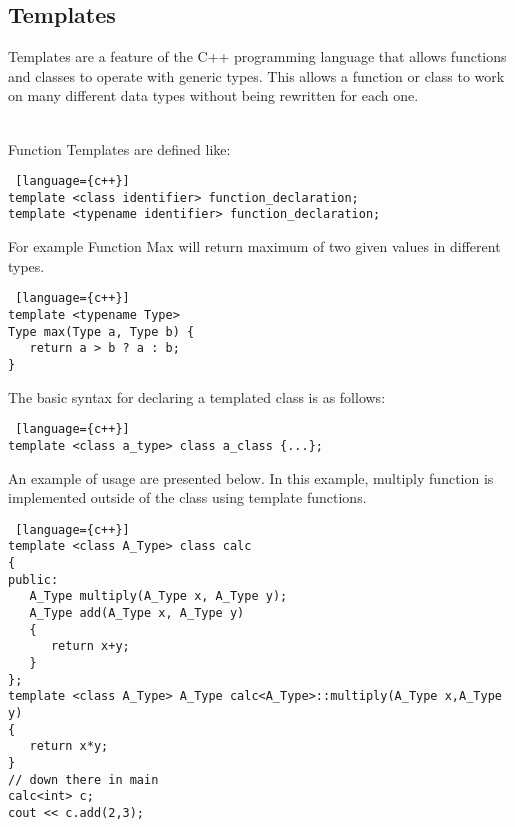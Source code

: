 \subsection{Templates}
Templates are a feature of the C++ programming language that allows functions and classes to operate with generic types. This allows a function or class to work on many different data types without being rewritten for each one.
\begin{note}\\
Function Templates are defined like:
\begin{lstlisting} [language={c++}]
template <class identifier> function_declaration;
template <typename identifier> function_declaration;
\end{lstlisting}
For example Function Max will return maximum of two given values in different types.
\begin{lstlisting} [language={c++}]
template <typename Type>
Type max(Type a, Type b) {
   return a > b ? a : b;
}
\end{lstlisting}
The basic syntax for declaring a templated class is as follows:
\begin{lstlisting} [language={c++}]
template <class a_type> class a_class {...};
\end{lstlisting}
An example of usage are presented below. In this example, multiply function is implemented outside of the class using template functions.
\begin{lstlisting} [language={c++}]
template <class A_Type> class calc
{
public:
   A_Type multiply(A_Type x, A_Type y);
   A_Type add(A_Type x, A_Type y)
   {
      return x+y;
   }
};
template <class A_Type> A_Type calc<A_Type>::multiply(A_Type x,A_Type y)
{
   return x*y;
}
// down there in main
calc<int> c;
cout << c.add(2,3);
\end{lstlisting}
\end{note}


